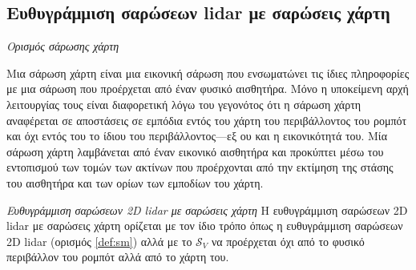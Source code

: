 \subsection{Ευθυγράμμιση σαρώσεων lidar με σαρώσεις χάρτη}


\begin{bw_box}
\begin{definition}
\label{def:map_scan}
\textit{Ορισμός σάρωσης χάρτη}

Μια σάρωση χάρτη είναι μια εικονική σάρωση που ενσωματώνει τις ίδιες
πληροφορίες με μια σάρωση που προέρχεται από έναν φυσικό αισθητήρα. Μόνο η
υποκείμενη αρχή λειτουργίας τους είναι διαφορετική λόγω του γεγονότος ότι η
σάρωση χάρτη αναφέρεται σε αποστάσεις σε εμπόδια εντός του χάρτη του
περιβάλλοντος του ρομπότ και όχι εντός του το ίδιου του περιβάλλοντος---εξ ου
και η εικονικότητά του. Μία σάρωση χάρτη λαμβάνεται από έναν εικονικό
αισθητήρα και προκύπτει μέσω του εντοπισμού των τομών των ακτίνων που
προέρχονται από την εκτίμηση της στάσης του αισθητήρα και των ορίων των
εμποδίων του χάρτη.
\end{definition}
\end{bw_box}

\begin{bw_box}
\begin{definition}
\label{def:smsm}
\textit{Ευθυγράμμιση σαρώσεων 2D lidar με σαρώσεις χάρτη}
Η ευθυγράμμιση σαρώσεων 2D lidar με σαρώσεις χάρτη ορίζεται με τον ίδιο τρόπο
όπως η ευθυγράμμιση σαρώσεων 2D lidar (ορισμός \ref{def:sm}) αλλά με το $\mathcal{S}_V$
να προέρχεται όχι από το φυσικό περιβάλλον του ρομπότ αλλά από το χάρτη του.
\end{definition}
\end{bw_box}

